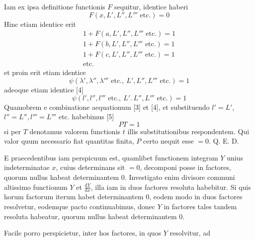 Iam ex ipsa definitione functionis $F$ sequitur, identice haberi
\[
F(x,L',L'',L'''\text{ etc.})=0
\]
Hinc etiam identice erit
\[
\begin{gathered}
1+F(a,L',L'',L'''\text{ etc.})=1\\
1+F(b,L',L'',L'''\text{ etc.})=1\\
1+F(c,L',L'',L'''\text{ etc.})=1\\
\text{etc.}
\end{gathered}
\]
et proin erit etiam identice
\[
\psi(\lambda',\lambda'',\lambda'''\text{ etc.},\ L',L'',L'''\text{ etc.})=1
\]
adeoque etiam identice [4]
\[
\psi(l',l'',l'''\text{ etc.},\ L'.\,L'',L'''\text{ etc.})=1
\]
Quamobrem e combinatione aequationum [3] et [4], et substituendo $l'=L'$,
$l''=L'',l'''=L'''$ etc. habebimus [5]
\[
PT=1
\]
si per $T$ denotamus valorem functionis $t$ illis substitutionibus respondentem.
Qui valor quum necessario fiat quantitas finita, $P$ certo nequit esse $=0$. Q. E. D.

E praecedentibus iam perspicuum est, quamlibet functionem integram $Y$
unius indeterminatae $x$, cuius determinans sit $=0$, decomponi posse in factores, quorum nullus habeat determinantem 0. Investigato enim divisore communi
altissimo functionum $Y$ et $\frac{\mathrm dY}{\mathrm dx}$, illa iam in duos factores resoluta habebitur. Si
quis horum factorum iterum habet determinantem 0, eodem modo in duos factores resolvetur, eodemque pacto continuabimus, donec $Y$ in factores tales tandem
resoluta habeatur, quorum nullus habeat determinantem 0.

Facile porro perspicietur, inter hos factores, in quos $Y$ resolvitur, ad
